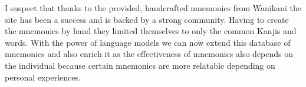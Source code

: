 I suspect that thanks to the provided, handcrafted mnemonics from Wanikani the site has been a success and is backed by a strong community. Having to create the mnemonics by hand they limited themselves to only the common Kanjis and words. With the power of language models we can now extend this database of mnemonics and also enrich it as the effectiveness of mnemonics also depends on the individual because certain mnemonics are more relatable depending on personal experiences. 



